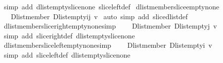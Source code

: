 \begin{isabellebody}
%
\isadelimproof
%
\endisadelimproof
%
\isatagproof
{}\isamarkupfalse%
\ {\isacharparenleft}simp\ add{\isacharcolon}\ dlist{\isacharunderscore}empty{\isacharunderscore}slice{\isacharunderscore}none\ slice{\isacharunderscore}left{\isacharunderscore}def{\isacharparenright}%
\endisatagproof
{\isafoldproof}%
%
\isadelimproof
\isanewline
%
\endisadelimproof
\isanewline
{}\isamarkupfalse%
\ dlist{\isacharunderscore}member{\isacharunderscore}slice{\isacharunderscore}empty{\isacharunderscore}none{\isacharcolon}\ \isanewline
\ \ {\isachardoublequoteopen}{\isasymnot}\ {\isacharparenleft}Dlist{\isachardot}member\ {\isacharparenleft}Dlist{\isachardot}empty{\isasymdagger}i{\isachardot}{\isachardot}j{\isacharparenright}\ v{\isacharparenright}{\isachardoublequoteclose}\isanewline
%
\isadelimproof
%
\endisadelimproof
%
\isatagproof
{}\isamarkupfalse%
\ {\isacharparenleft}auto\ simp\ add{\isacharcolon}\ slice{\isacharunderscore}dlist{\isacharunderscore}def{\isacharparenright}%
\endisatagproof
{\isafoldproof}%
%
\isadelimproof
\isanewline
%
\endisadelimproof
\isanewline
{}\isamarkupfalse%
\ dlist{\isacharunderscore}member{\isacharunderscore}slice{\isacharunderscore}right{\isacharunderscore}empty{\isacharunderscore}none{\isacharbrackleft}simp{\isacharbrackright}{\isacharcolon}\ \isanewline
\ \ {\isachardoublequoteopen}{\isasymnot}\ {\isacharparenleft}Dlist{\isachardot}member\ {\isacharparenleft}Dlist{\isachardot}empty{\isasymdagger}{\isachardot}{\isachardot}j{\isacharparenright}\ v{\isacharparenright}{\isachardoublequoteclose}\isanewline
%
\isadelimproof
%
\endisadelimproof
%
\isatagproof
{}\isamarkupfalse%
\ {\isacharparenleft}simp\ add{\isacharcolon}\ slice{\isacharunderscore}right{\isacharunderscore}def\ dlist{\isacharunderscore}empty{\isacharunderscore}slice{\isacharunderscore}none{\isacharparenright}%
\endisatagproof
{\isafoldproof}%
%
\isadelimproof
\isanewline
%
\endisadelimproof
\isanewline
{}\isamarkupfalse%
\ dlist{\isacharunderscore}member{\isacharunderscore}slice{\isacharunderscore}left{\isacharunderscore}empty{\isacharunderscore}none{\isacharbrackleft}simp{\isacharbrackright}{\isacharcolon}\ \isanewline
\ \ {\isachardoublequoteopen}{\isasymnot}\ {\isacharparenleft}Dlist{\isachardot}member\ {\isacharparenleft}Dlist{\isachardot}empty{\isasymdagger}i{\isachardot}{\isachardot}{\isacharparenright}\ v{\isacharparenright}{\isachardoublequoteclose}\isanewline
%
\isadelimproof
%
\endisadelimproof
%
\isatagproof
{}\isamarkupfalse%
\ {\isacharparenleft}simp\ add{\isacharcolon}\ slice{\isacharunderscore}left{\isacharunderscore}def\ dlist{\isacharunderscore}empty{\isacharunderscore}slice{\isacharunderscore}none{\isacharparenright}%

\end{isabellebody}
